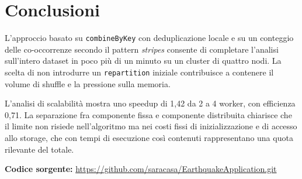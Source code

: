\documentclass[11pt,a4paper]{article}
\begin{document}
\section{Conclusioni}

L'approccio basato su \texttt{combineByKey} con deduplicazione locale e su un conteggio delle
co-occorrenze secondo il pattern \emph{stripes} consente di completare l'analisi sull'intero
dataset in poco più di un minuto su un cluster di quattro nodi. La scelta di non introdurre un
\texttt{repartition} iniziale contribuisce a contenere il volume di shuffle e la pressione
sulla memoria.

L'analisi di scalabilità mostra uno speedup di 1,42 da 2 a 4 worker, con efficienza 0,71. La
separazione fra componente fissa e componente distribuita chiarisce che il limite non risiede
nell'algoritmo ma nei costi fissi di inizializzazione e di
accesso allo storage, che con tempi di esecuzione così contenuti rappresentano una quota
rilevante del totale.


\vspace{0.4cm}
\noindent\textbf{Codice sorgente:}
\url{https://github.com/saracasa/EarthquakeApplication.git}
\end{document}
